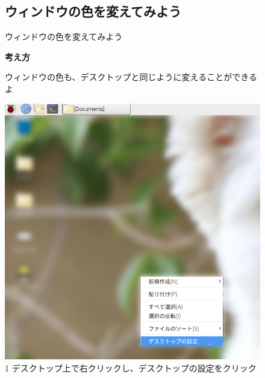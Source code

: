 \documentclass[a4paper,12pt]{jarticle}
\begin{document}
\begin{figure}
  \subsection{\theExercise ウィンドウの色を変えてみよう}
  ウィンドウの色を変えてみよう

  \textbf{考え方}


  \bigskip



  \centering
  \begin{minipage}{\textwidth}
      ウィンドウの色も、デスクトップと同じように変えることができるよ
  \end{minipage}
  \begin{minipage}{\textwidth}
    \begin{minipage}{0.45\linewidth}
      \includegraphics[width=\linewidth]{textbook-img107.png}\\
      1 デスクトップ上で右クリックし、デスクトップの設定をクリック
    \end{minipage}
    \begin{minipage}{2.582cm}

\end{minipage}
\end{minipage}
\end{figure}
\end{document}
